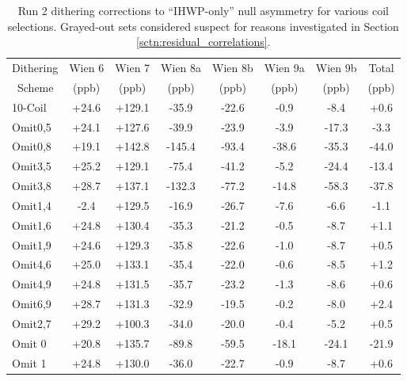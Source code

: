 \begin{table}[!h]

\caption{Run 2 dithering corrections to ``IHWP-only'' null asymmetry for various coil selections. Grayed-out sets considered suspect  for reasons investigated in Section \ref{sctn:residual_correlations}.}
\begin{center}
\begin{tabular}[h]{|l||c|c|c|c|c|c||c|}\hline
Dithering& Wien 6& Wien 7& Wien 8a& Wien 8b& Wien 9a& Wien 9b& Total\\
~Scheme&(ppb)&(ppb)&(ppb)&(ppb)&(ppb)&(ppb)&(ppb)\\\hline\hline
10-Coil& +24.6& +129.1& -35.9& -22.6& -0.9& -8.4& +0.6\\\hline
Omit0,5& +24.1& +127.6& -39.9& -23.9& -3.9& -17.3& -3.3\\\hline
{\color{Gray}Omit0,8}&{\color{Gray} +19.1}&{\color{Gray} +142.8}&{\color{Gray} -145.4}&{\color{Gray} -93.4}&{\color{Gray} -38.6}&{\color{Gray} -35.3}&{\color{Gray} -44.0}\\\hline
{\color{Gray}Omit3,5}&{\color{Gray} +25.2}&{\color{Gray} +129.1}&{\color{Gray} -75.4}&{\color{Gray} -41.2}&{\color{Gray} -5.2}&{\color{Gray} -24.4}&{\color{Gray} -13.4}\\\hline
{\color{Gray}Omit3,8}&{\color{Gray} +28.7}&{\color{Gray} +137.1}&{\color{Gray} -132.3}&{\color{Gray} -77.2}&{\color{Gray} -14.8}&{\color{Gray} -58.3}&{\color{Gray} -37.8}\\\hline
{\color{Gray}Omit1,4}&{\color{Gray} -2.4}&{\color{Gray} +129.5}&{\color{Gray} -16.9}&{\color{Gray} -26.7}&{\color{Gray} -7.6}&{\color{Gray} -6.6}&{\color{Gray} -1.1}\\\hline
Omit1,6& +24.8& +130.4& -35.3& -21.2& -0.5& -8.7& +1.1\\\hline
Omit1,9& +24.6& +129.3& -35.8& -22.6& -1.0& -8.7& +0.5\\\hline
Omit4,6& +25.0& +133.1& -35.4& -22.0& -0.6& -8.5& +1.2\\\hline
Omit4,9& +24.8& +131.5& -35.7& -23.2& -1.3& -8.6& +0.6\\\hline
Omit6,9& +28.7& +131.3& -32.9& -19.5& -0.2& -8.0& +2.4\\\hline
Omit2,7& +29.2& +100.3& -34.0& -20.0& -0.4& -5.2& +0.5\\\hline
{\color{Gray}Omit 0}&{\color{Gray} +20.8}&{\color{Gray} +135.7}&{\color{Gray} -89.8}&{\color{Gray} -59.5}&{\color{Gray} -18.1}&{\color{Gray} -24.1}&{\color{Gray} -21.9}\\\hline
Omit 1& +24.8& +130.0& -36.0& -22.7& -0.9& -8.7& +0.6\\\hline

\end{tabular}
\end{center}
\end{table}

